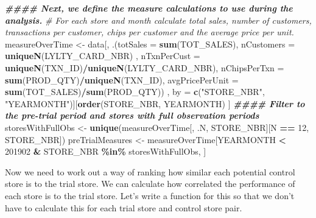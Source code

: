 \documentclass[
]{article}
\newenvironment{Shaded}{\begin{snugshade}}{\end{snugshade}}
\newcommand{\AttributeTok}[1]{\textcolor[rgb]{0.13,0.29,0.53}{#1}}
\newcommand{\CommentTok}[1]{\textcolor[rgb]{0.56,0.35,0.01}{\textit{#1}}}
\newcommand{\DecValTok}[1]{\textcolor[rgb]{0.00,0.00,0.81}{#1}}
\newcommand{\DocumentationTok}[1]{\textcolor[rgb]{0.56,0.35,0.01}{\textbf{\textit{#1}}}}
\newcommand{\FunctionTok}[1]{\textcolor[rgb]{0.13,0.29,0.53}{\textbf{#1}}}
\newcommand{\NormalTok}[1]{#1}
\newcommand{\OtherTok}[1]{\textcolor[rgb]{0.56,0.35,0.01}{#1}}
\newcommand{\SpecialCharTok}[1]{\textcolor[rgb]{0.81,0.36,0.00}{\textbf{#1}}}
\newcommand{\StringTok}[1]{\textcolor[rgb]{0.31,0.60,0.02}{#1}}
\begin{document}
\begin{Shaded}
\begin{Highlighting}[]
\DocumentationTok{\#\#\#\# Next, we define the measure calculations to use during the analysis.}
\CommentTok{\# For each store and month calculate total sales, number of customers, transactions per customer, chips per customer and the average price per unit.}
\NormalTok{measureOverTime }\OtherTok{\textless{}{-}}\NormalTok{ data[, .(}\AttributeTok{totSales =} \FunctionTok{sum}\NormalTok{(TOT\_SALES),}
                            \AttributeTok{nCustomers =} \FunctionTok{uniqueN}\NormalTok{(LYLTY\_CARD\_NBR) ,}
                            \AttributeTok{nTxnPerCust =} \FunctionTok{uniqueN}\NormalTok{(TXN\_ID)}\SpecialCharTok{/}\FunctionTok{uniqueN}\NormalTok{(LYLTY\_CARD\_NBR),}
                            \AttributeTok{nChipsPerTxn =} \FunctionTok{sum}\NormalTok{(PROD\_QTY)}\SpecialCharTok{/}\FunctionTok{uniqueN}\NormalTok{(TXN\_ID),}
                            \AttributeTok{avgPricePerUnit =} \FunctionTok{sum}\NormalTok{(TOT\_SALES)}\SpecialCharTok{/}\FunctionTok{sum}\NormalTok{(PROD\_QTY))}
\NormalTok{                        , by }\OtherTok{=} \FunctionTok{c}\NormalTok{(}\StringTok{"STORE\_NBR"}\NormalTok{, }\StringTok{"YEARMONTH"}\NormalTok{)][}\FunctionTok{order}\NormalTok{(STORE\_NBR, YEARMONTH) ]}
\DocumentationTok{\#\#\#\# Filter to the pre{-}trial period and stores with full observation periods}
\NormalTok{storesWithFullObs }\OtherTok{\textless{}{-}} \FunctionTok{unique}\NormalTok{(measureOverTime[, .N, STORE\_NBR][N }\SpecialCharTok{==} \DecValTok{12}\NormalTok{, STORE\_NBR])}
\NormalTok{preTrialMeasures }\OtherTok{\textless{}{-}}\NormalTok{ measureOverTime[YEARMONTH }\SpecialCharTok{\textless{}} \DecValTok{201902} \SpecialCharTok{\&}\NormalTok{ STORE\_NBR }\SpecialCharTok{\%in\%}
\NormalTok{storesWithFullObs, ]}
\end{Highlighting}
\end{Shaded}

Now we need to work out a way of ranking how similar each potential
control store is to the trial store. We can calculate how correlated the
performance of each store is to the trial store. Let's write a function
for this so that we don't have to calculate this for each trial store
and control store pair.
\end{document}
